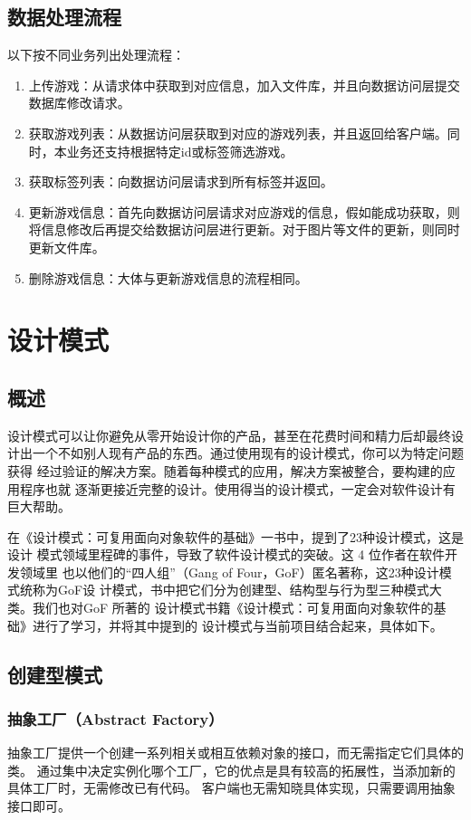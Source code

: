 \documentclass[12pt]{ctexart} %
\begin{document}
\subsection{数据处理流程}
以下按不同业务列出处理流程：
\begin{enumerate}
  \item 上传游戏：从请求体中获取到对应信息，加入文件库，并且向数据访问层提交数据库修改请求。
  \item 获取游戏列表：从数据访问层获取到对应的游戏列表，并且返回给客户端。同时，本业务还支持根据特定id或标签筛选游戏。
  \item 获取标签列表：向数据访问层请求到所有标签并返回。
  \item 更新游戏信息：首先向数据访问层请求对应游戏的信息，假如能成功获取，则将信息修改后再提交给数据访问层进行更新。对于图片等文件的更新，则同时更新文件库。
  \item 删除游戏信息：大体与更新游戏信息的流程相同。
\end{enumerate}
\section{设计模式}
\subsection{概述}
设计模式可以让你避免从零开始设计你的产品，甚至在花费时间和精力后却最终设
计出一个不如别人现有产品的东西。通过使用现有的设计模式，你可以为特定问题获得
经过验证的解决方案。随着每种模式的应用，解决方案被整合，要构建的应用程序也就
逐渐更接近完整的设计。使用得当的设计模式，一定会对软件设计有巨大帮助。

在《设计模式：可复用面向对象软件的基础》一书中，提到了23种设计模式，这是设计
模式领域里程碑的事件，导致了软件设计模式的突破。这 4 位作者在软件开发领域里
也以他们的“四人组”（Gang of Four，GoF）匿名著称，这23种设计模式统称为GoF设
计模式，书中把它们分为创建型、结构型与行为型三种模式大类。我们也对GoF 所著的
设计模式书籍《设计模式：可复用面向对象软件的基础》进行了学习，并将其中提到的
设计模式与当前项目结合起来，具体如下。

\subsection{创建型模式} %
\subsubsection{抽象工厂（Abstract Factory）} 
抽象工厂提供一个创建一系列相关或相互依赖对象的接口，而无需指定它们具体的类。
通过集中决定实例化哪个工厂，它的优点是具有较高的拓展性，当添加新的具体工厂时，无需修改已有代码。
客户端也无需知晓具体实现，只需要调用抽象接口即可。
\end{document}
